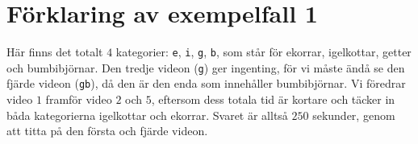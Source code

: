 \section*{Förklaring av exempelfall 1}
Här finns det totalt $4$ kategorier: \texttt e, \texttt i, \texttt g, \texttt b, som står för ekorrar, igelkottar, getter och bumbibjörnar.
Den tredje videon (\texttt{g}) ger ingenting, för vi måste ändå se den fjärde videon (\texttt{gb}), då den är den enda som innehåller bumbibjörnar.
Vi föredrar video $1$ framför video $2$ och $5$, eftersom dess totala tid är kortare och täcker in båda kategorierna igelkottar och ekorrar.
Svaret är alltså $250$ sekunder, genom att titta på den första och fjärde videon.

